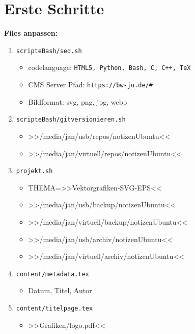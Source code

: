 \section{Erste Schritte}\label{erste-schritte}

\textbf{Files anpassen:}

\begin{enumerate}
\item
  \verb|scripteBash/sed.sh|

  \begin{itemize}
  \item
    codelanguage:
    \verb|HTML5, Python, Bash, C, C++, TeX|
  \item
    CMS Server Pfad: \verb|https://bw-ju.de/#|
  \item
    Bildformat: svg, png, jpg, webp
  \end{itemize}
\item
  \verb|scripteBash/gitversionieren.sh|

  \begin{itemize}
  \item
    >>/media/jan/usb/repos/notizenUbuntu<<
  \item
    >>/media/jan/virtuell/repos/notizenUbuntu<<
  \end{itemize}
\item
  \verb|projekt.sh|

  \begin{itemize}
  \item
    THEMA=>>Vektorgrafiken-SVG-EPS<<
  \item
    >>/media/jan/usb/backup/notizenUbuntu<<
  \item
    >>/media/jan/virtuell/backup/notizenUbuntu<<
  \item
    >>/media/jan/usb/archiv/notizenUbuntu<<
  \item
    >>/media/jan/virtuell/archiv/notizenUbuntu<<
  \end{itemize}
\item
  \verb|content/metadata.tex|

  \begin{itemize}
  \item
    Datum, Titel, Autor
  \end{itemize}
\item
  \verb|content/titelpage.tex|

  \begin{itemize}
  \item
    >>Grafiken/logo.pdf<<
  \end{itemize}
\end{enumerate}

